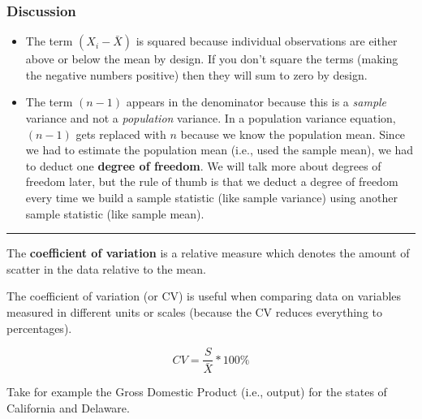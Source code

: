 \documentclass[
]{book}
\newenvironment{Shaded}{\begin{snugshade}}{\end{snugshade}}
\newcommand{\FunctionTok}[1]{\textcolor[rgb]{0.00,0.00,0.00}{#1}}
\newcommand{\NormalTok}[1]{#1}
\newcommand{\OtherTok}[1]{\textcolor[rgb]{0.56,0.35,0.01}{#1}}
\newcommand{\SpecialCharTok}[1]{\textcolor[rgb]{0.00,0.00,0.00}{#1}}
\newcommand{\StringTok}[1]{\textcolor[rgb]{0.31,0.60,0.02}{#1}}
\begin{document}
\hypertarget{discussion}{%
\subsubsection*{Discussion}\label{discussion}}

\begin{itemize}
\item
  The term \((X_i-\bar{X})\) is squared because individual observations are either above or below the mean by design. If you don't square the terms (making the negative numbers positive) then they will sum to zero by design.
\item
  The term \((n-1)\) appears in the denominator because this is a \emph{sample} variance and not a \emph{population} variance. In a population variance equation, \((n-1)\) gets replaced with \(n\) because we know the population mean. Since we had to estimate the population mean (i.e., used the sample mean), we had to deduct one \textbf{degree of freedom}. We will talk more about degrees of freedom later, but the rule of thumb is that we deduct a degree of freedom every time we build a sample statistic (like sample variance) using another sample statistic (like sample mean).
\end{itemize}

\begin{center}\rule{0.5\linewidth}{0.5pt}\end{center}

The \textbf{coefficient of variation} is a relative measure which denotes the amount of scatter in the data relative to the mean.

The coefficient of variation (or CV) is useful when comparing data on variables measured in different units or scales (because the CV reduces everything to percentages).

\[CV=\frac{S}{\bar{X}}*100\%\]

Take for example the Gross Domestic Product (i.e., output) for the states of California and Delaware.

\begin{Shaded}
\end{Shaded}
\end{document}
